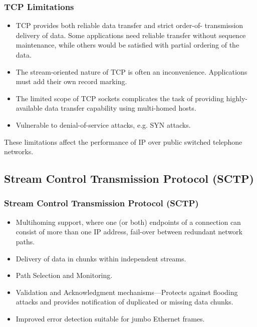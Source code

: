 \documentclass[notes,serif]{beamer}
\begin{document}
\begin{frame}
  \frametitle{TCP Limitations}
  \begin{itemize}
    \item TCP provides both reliable data transfer and strict order-of- transmission
    delivery of data. Some applications need reliable transfer without sequence maintenance,
    while others would be satisfied with partial ordering of the data.
    \item The stream-oriented nature of TCP is often an inconvenience.
    Applications must add their own record marking.
    \item The limited scope of TCP sockets complicates the task of providing highly-available data transfer capability using multi-homed hosts.
    \item Vulnerable to denial-of-service attacks, e.g. SYN attacks.
  \end{itemize}
  These limitations affect the performance of IP over public switched telephone networks.
\end{frame}

\subsection{Stream Control Transmission Protocol (SCTP)}
\begin{frame}
  \frametitle{Stream Control Transmission Protocol (SCTP)}
\begin{itemize}
  \item Multihoming support, where one (or both) endpoints of a connection can consist of more than one IP address, fail-over between redundant network paths.
  \item Delivery of data in chunks within independent streams.
  \item Path Selection and Monitoring.
  \item Validation and Acknowledgment mechanisms---Protects against flooding attacks and provides notification of duplicated or missing data chunks.
  \item Improved error detection suitable for jumbo Ethernet frames.
\end{itemize}
\end{frame}
\end{document}
